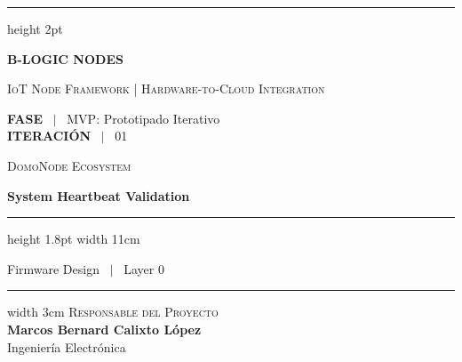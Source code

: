 \documentclass[11pt,a4paper]{article}
\newcommand{\faseactual}{MVP: Prototipado Iterativo}
\begin{document}
\begin{titlepage}
    \hrule height 2pt
    \vspace{0.4cm}
    
    \begin{flushleft}
        \begin{minipage}[t]{0.60\textwidth}
            {\color{BLogicNavy}\Large{}\textbf{B-LOGIC NODES}\par}
            \vspace{0.12cm}
            {\color{gray}\footnotesize\scshape IoT Node Framework | Hardware-to-Cloud Integration}
        \end{minipage}
        \begin{minipage}[t]{0.39\textwidth}
            \raggedleft
            {\color{gray}\scriptsize 
            \textbf{FASE} \ $|$ \ \faseactual \\ 
            \textbf{ITERACIÓN} \ $|$ \ 01}
        \end{minipage}
    \end{flushleft}
    
    \vspace{5.5cm}

    \begin{flushleft}
        {\color{gray}\footnotesize\scshape DomoNode Ecosystem}\par
        \vspace{0.25cm}
        {\Huge{}\textbf{System Heartbeat Validation}\par}
        \vspace{0.4cm}
        {\color{BLogicNavy}\hrule height 1.8pt width 11cm} 
        \vspace{0.6cm}
        {\small\textsf{Firmware Design \ $|$ \ Layer 0}}
    \end{flushleft}

    \vfill

    \begin{flushleft}
        \begin{minipage}{0.5\textwidth}
            \hrule width 3cm
            \vspace{0.3cm}
            {\footnotesize\color{gray}\scshape Responsable del Proyecto}\\
            \vspace{0.15cm}
            \textbf{Marcos Bernard Calixto López}\\
            {\small Ingeniería Electrónica}
        \end{minipage}
    \end{flushleft}


\end{titlepage}
\end{document}
